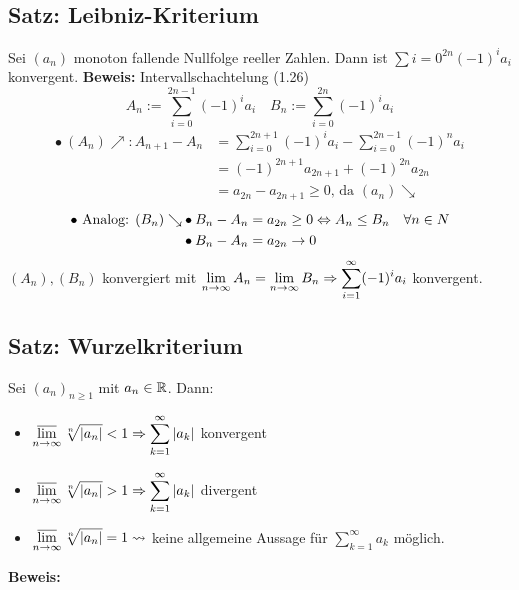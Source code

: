 \documentclass[10pt, a4paper, fleqn]{article}
\begin{document}
    \subsection{Satz: Leibniz-Kriterium}
    Sei $(a_n)$ monoton fallende Nullfolge reeller Zahlen. Dann ist
    $\sum{i=0}^{2n} (-1)^i a_i$ konvergent.
    \textbf{Beweis: }
    Intervallschachtelung (1.26)
    \[
        A_n := \sum_{i=0}^{2n-1} (-1)^i a_i \quad B_n := \sum_{i=0}^{2n} (-1)^i a_i
    \]
    \[\begin{aligned}   
        \bullet \ (A_n)\nearrow : A_{n+1} - A_n &= \sum_{i=0}^{2n+1} (-1)^i a_i -
        \sum_{i=0}^{2n-1} (-1)^n a_i \\
        &= (-1)^{2n+1} a_{2n+1} + (-1)^{2n} a_{2n} \\
        &= a_{2n} - a_{2n+1} \geq 0\text{, da } (a_n) \searrow 
    \end{aligned}\]
    \[\begin{aligned}
        \bullet\text{ Analog: } (B_n)\searrow  
            &\bullet B_n - A_n = a_{2n} \geq 0 \Leftrightarrow A_n \leq B_n \quad \forall n \in N \\
            &\bullet B_n - A_n = a_{2n} \to 0
    \end{aligned}\]
    $(A_n), (B_n)$ konvergiert mit $\displaystyle \lim_{n \to \infty} A_n = 
    \lim_{n \to \infty} B_n \Rightarrow \sum_{i=1}^\infty (-1)^i a_i$ konvergent.

    \subsection{Satz: Wurzelkriterium}
    Sei $(a_n)_{n \geq 1}$ mit $a_n \in \mathbb{R}$. Dann:
    \begin{itemize}
        \item $\displaystyle \varlimsup_{n \to \infty} \sqrt[n]{|a_n|} < 1 \Rightarrow \sum_{k=1}^\infty |a_k|$ konvergent
        \item $\displaystyle \varlimsup_{n \to \infty} \sqrt[n]{|a_n|} > 1 \Rightarrow \sum_{k=1}^\infty |a_k|$ divergent
        \item $\displaystyle \varlimsup_{n \to \infty} \sqrt[n]{|a_n|} = 1 \leadsto $ keine allgemeine Aussage für
        $\sum_{k=1}^\infty a_k$ möglich.
    \end{itemize}

    \textbf{Beweis: }
\end{document}
